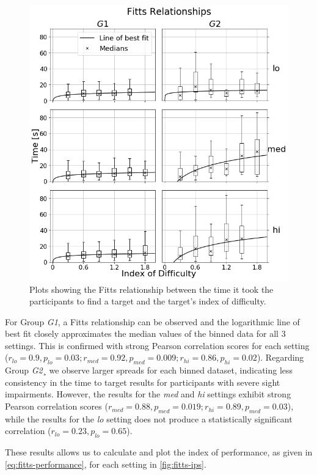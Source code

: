 \documentclass{article}
\begin{document}
\begin{figure}
  \centering
  \includegraphics[width=1.0\textwidth]{figures/fitts_fit.png}
  \caption{Plots showing the Fitts relationship between the time it took the participants to find a target and the target's index of difficulty. }\label{fig:fitts-results}
\end{figure}

For Group \textit{G1}, a Fitts relationship can be observed and the logarithmic line of best fit closely approximates the median values of the binned data for all 3 settings. 
This is confirmed with strong Pearson correlation scores for each setting ($r_{lo} = 0.9, p_{lo} = 0.03; r_{med} = 0.92, p_{med}=0.009; r_{hi} = 0.86, p_{hi} = 0.02$).
Regarding Group \textit{G2}¸ we observe larger spreads for each binned dataset, indicating less consistency in the time to target results for participants with severe sight impairments.
However, the results for the \textit{med} and \textit{hi} settings exhibit strong Pearson correlation scores ($r_{med} = 0.88, p_{med} = 0.019; r_{hi} = 0.89, p_{med} = 0.03$), while the results for the \textit{lo} setting does not produce a statistically significant correlation ($r_{lo} = 0.23, p_{lo} = 0.65$).

These results allows us to calculate and plot the index of performance, as given in \cref{eq:fitts-performance}, for each setting in \cref{fig:fitts-ips}.
\end{document}
